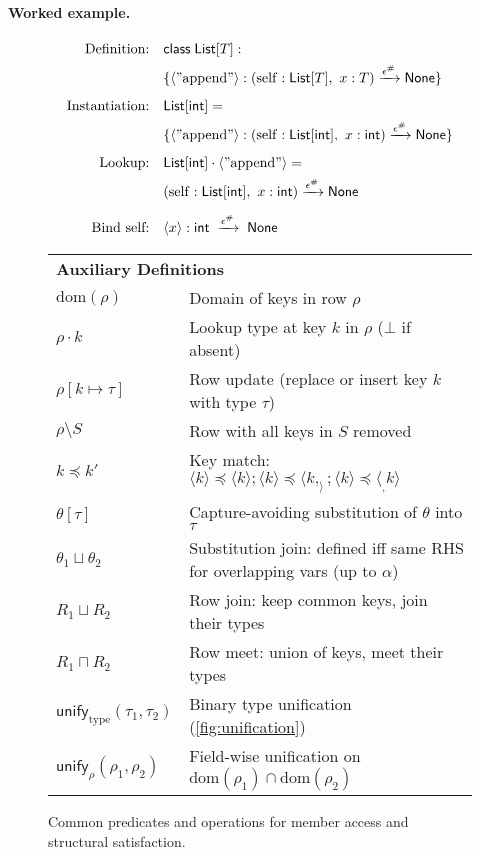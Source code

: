 \paragraph{Worked example.}
\[
\begin{aligned}
\text{Definition:} \quad & \mathsf{class}\; \mathsf{List}[T] :
\\ & \{\langle \mathrm{"append"} \rangle : (\mathrm{self}:\mathsf{List}[T],\ x:T) \xrightarrow{\epsilon^\#} \mathsf{None} \} \\[0.5em]
\text{Instantiation:} \quad & \mathsf{List}[\mathsf{int}] =
\\ & \{\langle \mathrm{"append"} \rangle : (\mathrm{self}:\mathsf{List}[\mathsf{int}],\ x:\mathsf{int}) \xrightarrow{\epsilon^\#} \mathsf{None} \} \\[0.5em]
\text{Lookup:} \quad & \mathsf{List}[\mathsf{int}] \cdot \langle \mathrm{"append"} \rangle =
\\ & (\mathrm{self}:\mathsf{List}[\mathsf{int}],\ x:\mathsf{int}) \xrightarrow{\epsilon^\#} \mathsf{None} \\[0.5em]
\text{Bind self:} \quad & \langle x\rangle:\mathsf{int} \;\xrightarrow{\epsilon^\#}\; \mathsf{None}
\end{aligned}
\]

\begin{figure}[t]
\centering
\renewcommand{\arraystretch}{1.2}
\begin{tabular}{l l}
\multicolumn{2}{l}{\textbf{Auxiliary Definitions}} \\[0.3em]
$\mathrm{dom}(\rho)$ & Domain of keys in row $\rho$ \\
$\rho \cdot k$ & Lookup type at key $k$ in $\rho$ ($\bot$ if absent) \\
$\rho[k \mapsto \tau]$ & Row update (replace or insert key $k$ with type $\tau$) \\
$\rho \setminus S$ & Row with all keys in $S$ removed \\
$k \preccurlyeq k'$ & Key match: $\langle k \rangle \preccurlyeq \langle k \rangle; \langle k \rangle \preccurlyeq \langle k, _ \rangle; \langle k \rangle \preccurlyeq \langle _, k \rangle$ \\
$\theta[\tau]$ & Capture-avoiding substitution of $\theta$ into $\tau$ \\
$\theta_1 \sqcup \theta_2$ & Substitution join: defined iff same RHS for overlapping vars (up to $\alpha$) \\
$R_1 \sqcup R_2$ & Row join: keep common keys, join their types \\
$R_1 \sqcap R_2$ & Row meet: union of keys, meet their types \\
$\mathsf{unify}_{\mathrm{type}}(\tau_1,\tau_2)$ & Binary type unification (\cref{fig:unification}) \\
$\mathsf{unify}_{\rho}(\rho_1,\rho_2)$ & Field-wise unification on $\mathrm{dom}(\rho_1) \cap \mathrm{dom}(\rho_2)$
\end{tabular}
\caption{Common predicates and operations for member access and structural satisfaction.}
\label{fig:auxiliary-defs}
\end{figure}

